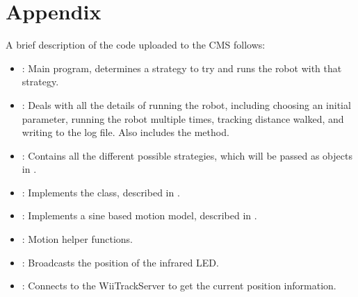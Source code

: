 \section{Appendix}

A brief description of the code uploaded to the CMS follows:

\begin{itemize}
\item {}: Main program, determines a strategy to try and runs the robot
  with that strategy.
\item {}: Deals with all the details of running the robot,
  including choosing an initial parameter, running the robot multiple times, 
  tracking distance walked, and writing to the log file. Also includes the
   method.
\item {}: Contains all the different possible strategies, which
  will be passed as objects in . 
\item {}: Implements the  class, described in
  .
\item {}: Implements a sine based motion model,
  described in .
\item {}: Motion helper functions.
\item {}: Broadcasts the position of the infrared LED.
\item {}: Connects to the WiiTrackServer to get the current position information.
\end{itemize}


